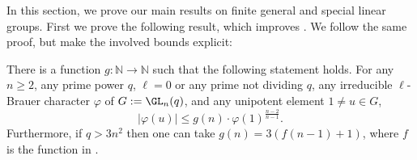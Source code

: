 \documentclass[eqthmnum,nocolour,skinny]{jt-calcs}
\newcommand{\N}{\mathbb {N}}
\begin{document}
In this section, we prove our main results on finite general and special linear groups. First we prove the following result, which improves 
\cite[Thm.~3.3]{bezrukavnikov-liebeck-shalev-tiep:2017:character-bounds-grps-Lie-type}. We follow the same proof, but make the involved 
bounds explicit:

\begin{thm}\label{gl-uni}
There is a function $g:\N \to \N$ such that the following statement holds. For any $n \geq 2$, any prime
power $q$, $\ell = 0$ or any prime not dividing $q$, any irreducible $\ell$-Brauer character $\varphi$ of
$G:= \GL_n(q)$, and any unipotent element $1 \neq u \in G$,
\begin{equation*}
|\varphi(u)| \leq g(n) \cdot \varphi(1)^{\frac{n-2}{n-1}}.
\end{equation*}
Furthermore, if $q > 3n^2$ then one can take $g(n) = 3(f(n-1)+1)$, where $f$ is the function in 
\cite[Thm.~1.1]{bezrukavnikov-liebeck-shalev-tiep:2017:character-bounds-grps-Lie-type}.
\end{thm}
\end{document}

